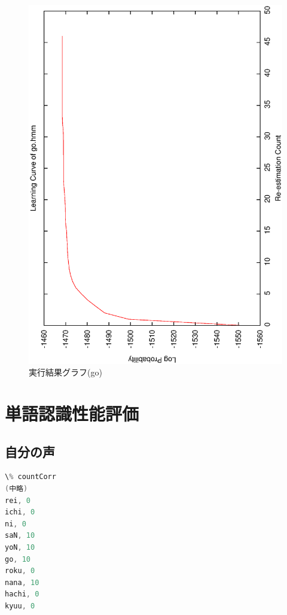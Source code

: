 \documentclass[11pt,a4paper, uplatex]{jsarticle}
\begin{document}
\begin{figure}[h]
  \begin{center}
    \includegraphics[width=13.0cm]{learningCurve.ps}
    \caption{実行結果グラフ(go)}
    \label{fig:ps}
  \end{center}
\end{figure}

\section{単語認識性能評価}
\subsection{自分の声}
\begin{lstlisting}[language=c, caption=\texttt{countCorr}実行結果]
\% countCorr
(中略)
rei, 0
ichi, 0
ni, 0
saN, 10
yoN, 10
go, 10
roku, 0
nana, 10
hachi, 0
kyuu, 0
\end{lstlisting}
\end{document}
